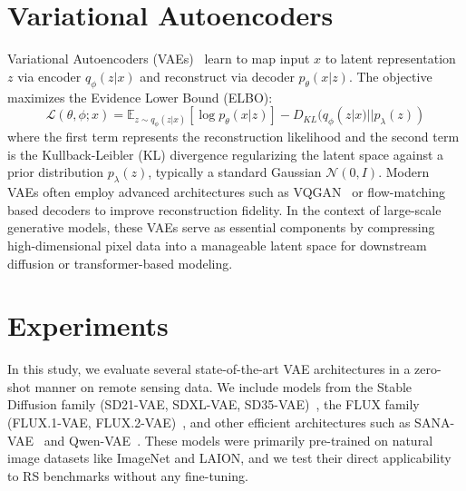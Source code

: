 \documentclass{article} %
\begin{document}
\section{Variational Autoencoders}

Variational Autoencoders (VAEs)~\citep{kingmaAutoEncodingVariationalBayes2014} learn to map input $x$ to latent representation $z$ via encoder $q_\phi(z|x)$ and reconstruct via decoder $p_\theta(x|z)$. The objective maximizes the Evidence Lower Bound (ELBO):
\begin{equation}
\mathcal{L}(\theta, \phi; x) = \mathbb{E}_{z \sim q_\phi(z|x)}[\log p_\theta(x|z)] - D_{KL}(q_\phi(z|x) || p_\lambda(z))
\end{equation}
where the first term represents the reconstruction likelihood and the second term is the Kullback-Leibler (KL) divergence regularizing the latent space against a prior distribution $p_\lambda(z)$, typically a standard Gaussian $\mathcal{N}(0, I)$. Modern VAEs often employ advanced architectures such as VQGAN~\citep{esserTamingTransformersHighResolution2021} or flow-matching based decoders to improve reconstruction fidelity. In the context of large-scale generative models, these VAEs serve as essential components by compressing high-dimensional pixel data into a manageable latent space for downstream diffusion or transformer-based modeling.

\section{Experiments}\label{sec:experiments}

In this study, we evaluate several state-of-the-art VAE architectures in a zero-shot manner on remote sensing data. We include models from the Stable Diffusion family (SD21-VAE, SDXL-VAE, SD35-VAE)~\citep{rombachHighResolutionImageSynthesis2022,podellSDXLImprovingLatent2024}, the FLUX family (FLUX.1-VAE, FLUX.2-VAE)~\citep{labsFLUX1KontextFlow2025,labFLUX2FrontierVisual2025}, and other efficient architectures such as SANA-VAE~\citep{xieSANAEfficientHighResolution2025} and Qwen-VAE~\citep{wuQwenImageTechnicalReport2025}. These models were primarily pre-trained on natural image datasets like ImageNet and LAION, and we test their direct applicability to RS benchmarks without any fine-tuning.
\end{document}
